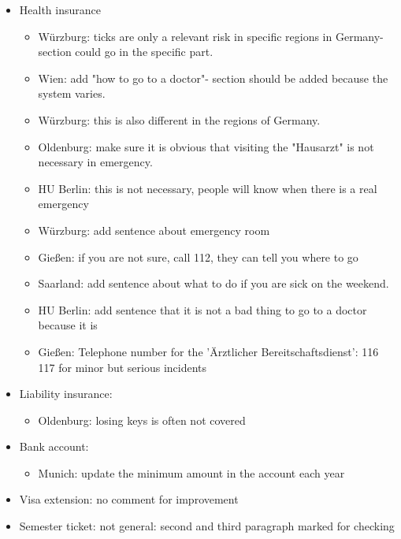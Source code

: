 \begin{itemize}
        \item Health insurance
          \begin{itemize}
            \item Würzburg: ticks are only a relevant risk in specific regions in Germany- section could go in the specific part.
            \item Wien: add "how to go to a doctor"- section should be added because the system varies.
            \item Würzburg: this is also different in the regions of Germany.
            \item Oldenburg: make sure it is obvious that visiting the "Hausarzt" is not necessary in emergency.
            \item HU Berlin: this is not necessary, people will know when there is a real emergency
            \item Würzburg: add sentence about emergency room
            \item Gießen: if you are not sure, call 112, they can tell you where to go
            \item Saarland: add sentence about what to do if you are sick on the weekend.
            \item HU Berlin: add sentence that it is not a bad thing to go to a doctor because it is
            \item Gießen: Telephone number for the 'Ärztlicher Bereitschaftsdienst': 116 117 for minor but serious incidents
          \end{itemize}

        \item Liability insurance:
          \begin{itemize}
            \item Oldenburg: losing keys is often not covered
          \end{itemize}
        \item Bank account:
          \begin{itemize}
            \item Munich: update the minimum amount in the account each year
          \end{itemize}

        \item Visa extension: no comment for improvement

        \item Semester ticket: not general: second and third paragraph marked for checking


\end{itemize}
